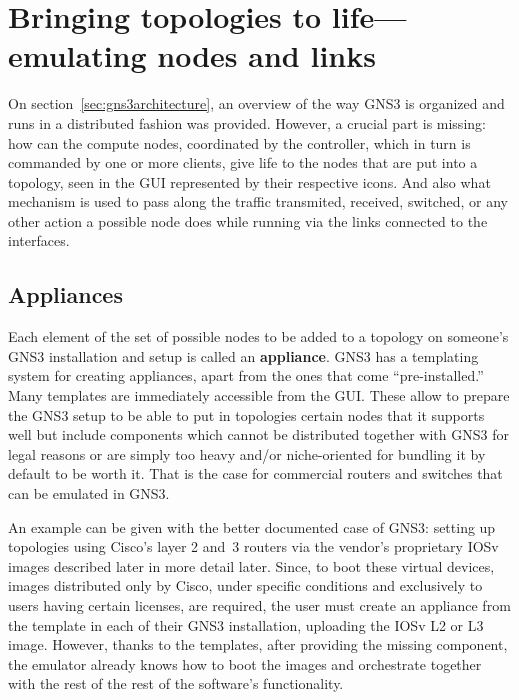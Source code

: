 \section{Bringing topologies to life---emulating nodes and links}
\label{sec:gns3emulating}

On section~\ref{sec:gns3architecture}, an overview of the way GNS3 is organized and runs in a distributed fashion was provided.
However, a crucial part is missing: how can the compute nodes, coordinated by the controller, which in turn is commanded by one or more clients, give life to the nodes that are put into a topology, seen in the GUI represented by their respective icons.
And also what mechanism is used to pass along the traffic transmited, received, switched, or any other action a possible node does while running via the links connected to the interfaces.

\subsection{Appliances}
\label{subsec:gns3appliances}

Each element of the set of possible nodes to be added to a topology on someone's GNS3 installation and setup is called an \textbf{appliance}.
GNS3 has a templating system for creating appliances, apart from the ones that come ``pre-installed.''
Many templates are immediately accessible from the GUI.
These allow to prepare the GNS3 setup to be able to put in topologies certain nodes that it supports well but include components which cannot be distributed together with GNS3 for legal reasons or are simply too heavy and/or niche-oriented for bundling it by default to be worth it.
That is the case for commercial routers and switches that can be emulated in GNS3.

An example can be given with the better documented case of GNS3: setting up topologies using Cisco's layer 2 and~3 routers via the vendor's proprietary IOSv images described later in more detail later.
Since, to boot these virtual devices, images distributed only by Cisco, under specific conditions and exclusively to users having certain licenses, are required, the user must create an appliance from the template in each of their GNS3 installation, uploading the IOSv L2 or L3 image.
However, thanks to the templates, after providing the missing component, the emulator already knows how to boot the images and orchestrate together with the rest of the rest of the software's functionality.

